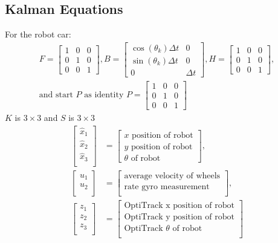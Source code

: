 \documentclass[11pt]{article}
\begin{document}
\subsection*{Kalman Equations}
For the robot car:
\begin{gather*}
    F=
    \begin{bmatrix}1&0&0\\0&1&0\\0&0&1
    \end{bmatrix},
    B=
    \begin{bmatrix} \cos(\theta_k)\Delta t & 0 \\
        \sin(\theta_k)\Delta t & 0 \\
        0 & \Delta t
    \end{bmatrix},
    H=
    \begin{bmatrix}1&0&0\\0&1&0\\0&0&1
    \end{bmatrix},
    \\
    \text{and start $P$ as identity } P=
    \begin{bmatrix}1&0&0\\0&1&0\\0&0&1
    \end{bmatrix}
\end{gather*}
$K$ is $3 \times 3$ and $S$ is $3 \times 3$
%
\begin{align*}
    \begin{bmatrix}{\hat{x}}_1\\
        {\hat{x}}_2\\
        {\hat{x}}_3\\
    \end{bmatrix}&=
    \begin{bmatrix}x \text{ position of robot}\\
        y \text{ position of robot}\\
        \theta \text{ of robot}
    \end{bmatrix},\\
    \left[
        \begin{matrix}u_1\\u_2\\
    \end{matrix}\right]&=
    \begin{bmatrix}\text{average velocity of wheels}\\\text{rate gyro measurement}\\
    \end{bmatrix},\\
    \begin{bmatrix}z_1\\z_2\\z_3\\
    \end{bmatrix}&=
    \begin{bmatrix}\text{OptiTrack x position of robot}\\\text{OptiTrack y position of robot}\\\text{OptiTrack $\theta$ of robot}\\
    \end{bmatrix}
\end{align*}
\end{document}
